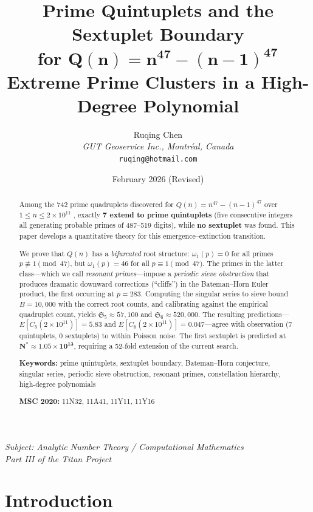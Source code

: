 \documentclass[11pt,a4paper]{article}
\title{\textbf{Prime Quintuplets and the Sextuplet Boundary} \\[6pt]
\textbf{for} $\boldsymbol{Q(n) = n^{47} - (n-1)^{47}}$ \\[6pt]
\large Extreme Prime Clusters in a High-Degree Polynomial}
\author{Ruqing Chen \\[4pt]
\textit{GUT Geoservice Inc., Montr\'eal, Canada} \\
\texttt{ruqing@hotmail.com}}
\date{February 2026 (Revised)}
\begin{document}
\maketitle
\thispagestyle{fancy}

\begin{center}
\textit{Subject: Analytic Number Theory / Computational Mathematics} \\[4pt]
\textit{Part III of the Titan Project}
\end{center}

\begin{abstract}
Among the 742 prime quadruplets discovered for
$Q(n) = n^{47} - (n{-}1)^{47}$ over $1 \leq n \leq 2 \times 10^{11}$
\cite{Chen2026b}, exactly \textbf{7 extend to prime quintuplets}
(five consecutive integers all generating probable primes of
487--519 digits), while \textbf{no sextuplet} was found.
This paper develops a quantitative theory for this emergence--extinction
transition.

We prove that $Q(n)$ has a \emph{bifurcated} root structure:
$\omega_1(p) = 0$ for all primes $p \not\equiv 1 \pmod{47}$,
but $\omega_1(p) = 46$ for all $p \equiv 1 \pmod{47}$.
The primes in the latter class---which we call \emph{resonant primes}---impose
a \emph{periodic sieve obstruction} that produces dramatic downward
corrections (``cliffs'') in the Bateman--Horn Euler product,
the first occurring at $p = 283$.
Computing the singular series to sieve bound $B = 10{,}000$ with the
correct root counts, and calibrating against the empirical quadruplet
count, yields
$\mathfrak{S}_5 \approx 57{,}100$ and
$\mathfrak{S}_6 \approx 520{,}000$.
The resulting predictions---$E[C_5(2 \times 10^{11})] = 5.83$ and
$E[C_6(2 \times 10^{11})] = 0.047$---agree with observation
(7 quintuplets, 0 sextuplets) to within Poisson noise.
The first sextuplet is predicted at
$\boldsymbol{N^* \approx 1.05 \times 10^{13}}$,
requiring a 52-fold extension of the current search.

\medskip
\noindent\textbf{Keywords:}
prime quintuplets, sextuplet boundary, Bateman--Horn conjecture,
singular series, periodic sieve obstruction, resonant primes,
constellation hierarchy, high-degree polynomials

\medskip
\noindent\textbf{MSC 2020:} 11N32, 11A41, 11Y11, 11Y16
\end{abstract}

\newpage

\section{Introduction}
\end{document}
